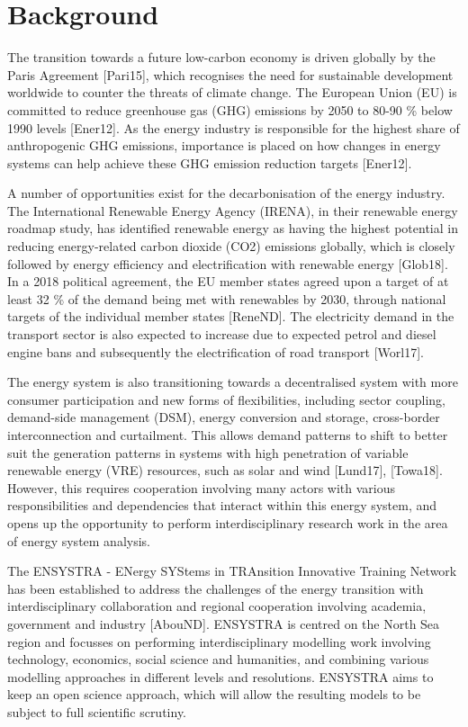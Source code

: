 \hypertarget{background}{%
\section{Background}\label{background}}

The transition towards a future low-carbon economy is driven globally by
the Paris Agreement {[}Pari15{]}, which recognises the need for
sustainable development worldwide to counter the threats of climate
change. The European Union (EU) is committed to reduce greenhouse gas
(GHG) emissions by 2050 to 80-90 \% below 1990 levels {[}Ener12{]}. As
the energy industry is responsible for the highest share of
anthropogenic GHG emissions, importance is placed on how changes in
energy systems can help achieve these GHG emission reduction targets
{[}Ener12{]}.

A number of opportunities exist for the decarbonisation of the energy
industry. The International Renewable Energy Agency (IRENA), in their
renewable energy roadmap study, has identified renewable energy as
having the highest potential in reducing energy-related carbon dioxide
(CO2) emissions globally, which is closely followed by energy efficiency
and electrification with renewable energy {[}Glob18{]}. In a 2018
political agreement, the EU member states agreed upon a target of at
least 32 \% of the demand being met with renewables by 2030, through
national targets of the individual member states {[}ReneND{]}. The
electricity demand in the transport sector is also expected to increase
due to expected petrol and diesel engine bans and subsequently the
electrification of road transport {[}Worl17{]}.

The energy system is also transitioning towards a decentralised system
with more consumer participation and new forms of flexibilities,
including sector coupling, demand-side management (DSM), energy
conversion and storage, cross-border interconnection and curtailment.
This allows demand patterns to shift to better suit the generation
patterns in systems with high penetration of variable renewable energy
(VRE) resources, such as solar and wind {[}Lund17{]}, {[}Towa18{]}.
However, this requires cooperation involving many actors with various
responsibilities and dependencies that interact within this energy
system, and opens up the opportunity to perform interdisciplinary
research work in the area of energy system analysis.

The ENSYSTRA - ENergy SYStems in TRAnsition Innovative Training Network
has been established to address the challenges of the energy transition
with interdisciplinary collaboration and regional cooperation involving
academia, government and industry {[}AbouND{]}. ENSYSTRA is centred on
the North Sea region and focusses on performing interdisciplinary
modelling work involving technology, economics, social science and
humanities, and combining various modelling approaches in different
levels and resolutions. ENSYSTRA aims to keep an open science approach,
which will allow the resulting models to be subject to full scientific
scrutiny.

